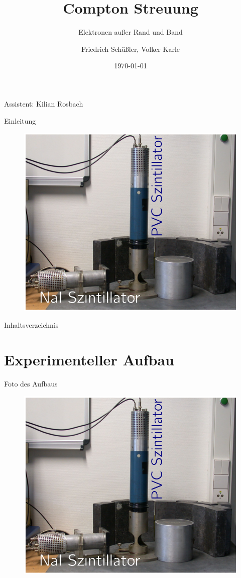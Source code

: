 \documentclass[xcolor=x11names,compress]{beamer}
\renewcommand{\(}{\begin{columns}}
\renewcommand{\)}{\end{columns}}
\newcommand{\<}[1]{\begin{column}{#1}}
\renewcommand{\>}{\end{column}}
\begin{document}
\begin{frame}{}
\title[Compton]{Compton Streuung}
\subtitle{Elektronen außer Rand und Band}
\author{
Friedrich Schüßler, Volker Karle}
\date{\today}
\titlepage

\centering 
Assistent: Kilian Rosbach
\end{frame}
\begin{frame}[t]{Einleitung}
\begin{figure}[htpb]
    \centering
    \includegraphics[width=0.7\linewidth]{../figures/photographie1}
\label{fig:foto}
\end{figure}
\end{frame}


\begin{frame}{Inhaltsverzeichnis}
\tableofcontents
\end{frame}



\section{Experimenteller Aufbau}
\begin{frame}[t]{Foto des Aufbaus}
\begin{figure}[htpb]
    \centering
    \includegraphics[width=0.7\linewidth]{../figures/photographie1}
\label{fig:foto}
\end{figure}
\end{frame}
\end{document}
